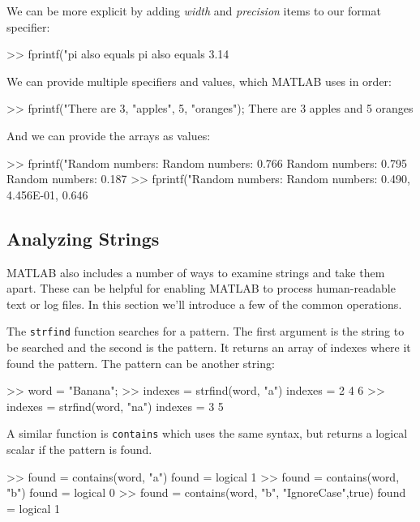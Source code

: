 We can be more explicit by adding \emph{width} and \emph{precision} items to our format specifier:
\begin{code}
>> fprintf("pi also equals %
    pi also equals 3.14
\end{code}

We can provide multiple specifiers and values, which MATLAB uses in order:
\begin{code}
>> fprintf("There are %
3, "apples", 5, "oranges");
    There are 3 apples and 5 oranges
\end{code}

And we can provide the arrays as values:
\begin{code}
>> fprintf("Random numbers: %
Random numbers: 0.766
Random numbers: 0.795
Random numbers: 0.187
>> fprintf("Random numbers: %
Random numbers: 0.490, 4.456E-01, 0.646 
\end{code}




\subsection{Analyzing Strings}

MATLAB also includes a number of ways to examine strings and take them apart.  These can be helpful for enabling MATLAB to process human-readable text or log files.  In this section we'll introduce a few of the common operations.

The \lstinline{strfind} function searches for a pattern.  The first argument is the string to be searched and the second is the pattern.  It returns an array of indexes where it found the pattern. The pattern can be another string:
\begin{code}
>> word = "Banana";
>> indexes = strfind(word, "a")
    indexes =
         2     4     6
>> indexes = strfind(word, "na")
    indexes =
          3     5
\end{code}
A similar function is \lstinline{contains} which uses the same syntax, but returns a logical scalar if the pattern is found.
\begin{code}
>> found = contains(word, "a")
found =
  logical
   1
>> found = contains(word, "b")
found =
  logical
   0
>> found = contains(word, "b", "IgnoreCase",true)
found =
  logical
   1
\end{code}

